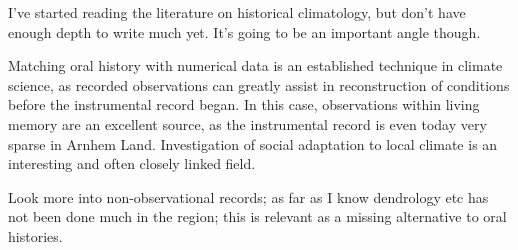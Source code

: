 
I've started reading the literature on historical climatology, but don't have
enough depth to write much yet.  It's going to be an important angle though.

Matching oral history with numerical data is an established technique in
climate science, as recorded observations can greatly assist in reconstruction
of conditions before the instrumental record began.  In this case, observations
within living memory are an excellent source, as the instrumental record is
even today very sparse in Arnhem Land.  Investigation of social adaptation to
local climate is an interesting and often closely linked field.

Look more into non-observational records; as far as I know dendrology etc has
not been done much in the region; this is relevant as a missing alternative to
oral histories.
